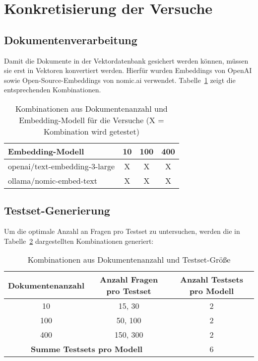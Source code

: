 \section{Konkretisierung der Versuche}

\subsection{Dokumentenverarbeitung}

Damit die Dokumente in der Vektordatenbank gesichert werden können, müssen sie erst in Vektoren konvertiert werden.
Hierfür wurden Embeddings von OpenAI sowie Open-Source-Embeddings von nomic.ai \cite{nomic_embed_text_v1_blog} verwendet.
Tabelle~\ref{tab:dokument-erstellung} zeigt die entsprechenden Kombinationen.

\begin{table}[htbp]
    \centering
    \caption[Kombinationen aus Dokumentenanzahl und Embedding-Modell]{Kombinationen aus Dokumentenanzahl und Embedding-Modell für die Versuche (X = Kombination wird getestet)}
    \begin{tabular}{|l|c|c|c|}
        \hline
        \textbf{Embedding-Modell} & \textbf{10} & \textbf{100} & \textbf{400} \\
        \hline
        openai/text-embedding-3-large & X & X & X \\
        ollama/nomic-embed-text       & X & X & X \\
        \hline
    \end{tabular}
    \label{tab:dokument-erstellung}
\end{table}

\subsection{Testset-Generierung}

Um die optimale Anzahl an Fragen pro Testset zu untersuchen, werden die in Tabelle~\ref{tab:testset_generation} dargestellten Kombinationen generiert:

\begin{table}[htbp]
    \centering
    \caption{Kombinationen aus Dokumentenanzahl und Testset-Größe}
    \begin{tabular}{|c|c|c|}
        \hline
        \textbf{Dokumentenanzahl} & \textbf{Anzahl Fragen pro Testset} & \textbf{Anzahl Testsets pro Modell} \\
        \hline
        10   & 15, 30    & 2 \\
        100  & 50, 100   & 2 \\
        400 & 150, 300  & 2 \\
        \hline
        \multicolumn{2}{|c|}{\textbf{Summe Testsets pro Modell}} & 6 \\
        \hline
    \end{tabular}
    \label{tab:testset_generation}
\end{table}

